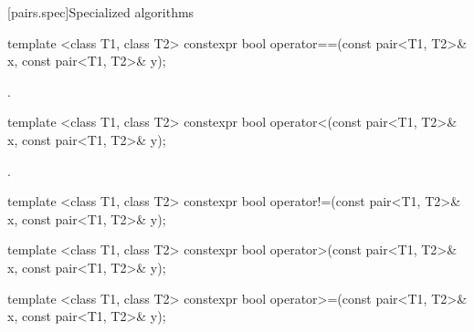 [pairs.spec]{Specialized algorithms}

%
\begin{itemdecl}
template <class T1, class T2>
  constexpr bool operator==(const pair<T1, T2>& x, const pair<T1, T2>& y);
\end{itemdecl}

\begin{itemdescr}
\pnum
\returns
{}.
\end{itemdescr}

%
\begin{itemdecl}
template <class T1, class T2>
  constexpr bool operator<(const pair<T1, T2>& x, const pair<T1, T2>& y);
\end{itemdecl}

\begin{itemdescr}
\pnum
\returns
{}.
\end{itemdescr}

%
\begin{itemdecl}
template <class T1, class T2>
  constexpr bool operator!=(const pair<T1, T2>& x, const pair<T1, T2>& y);
\end{itemdecl}

\begin{itemdescr}
\pnum
\returns {}
\end{itemdescr}

%
\begin{itemdecl}
template <class T1, class T2>
  constexpr bool operator>(const pair<T1, T2>& x, const pair<T1, T2>& y);
\end{itemdecl}

\begin{itemdescr}
\pnum
\returns {}
\end{itemdescr}

%
\begin{itemdecl}
template <class T1, class T2>
  constexpr bool operator>=(const pair<T1, T2>& x, const pair<T1, T2>& y);
\end{itemdecl}

\begin{itemdescr}
\pnum
\returns {}
\end{itemdescr}

